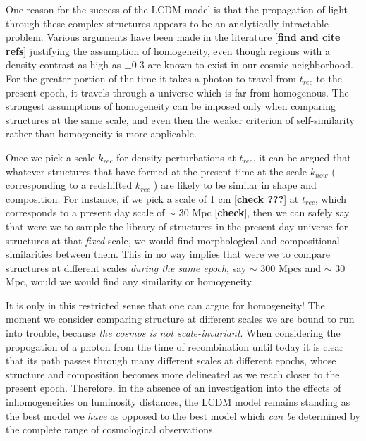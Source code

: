 One reason for the success of the LCDM model is that the propagation of light through these complex structures appears to be an analytically intractable problem. Various arguments have been made in the literature [\textbf{find and cite refs}] justifying the assumption of homogeneity, even though regions with a density contrast as high as $ \pm 0.3 $ are known to exist in our cosmic neighborhood. For the greater portion of the time it takes a photon to travel from $ t_{rec} $ to the present epoch, it travels through a universe which is far from homogenous. The strongest assumptions of homogeneity can be imposed only when comparing structures at the same scale, and even then the weaker criterion of self-similarity rather than homogeneity is more applicable.

Once we pick a scale $ k_{rec} $ for density perturbations at $ t_{rec}  $, it can be argued that whatever structures that have formed at the present time at the scale $ k_{now} $ ( corresponding to a redshifted $ k_{rec} $ ) are likely to be similar in shape and composition. For instance, if we pick a scale of 1 cm [\textbf{check ???}] at $ t_{rec} $, which corresponds to a present day scale of $ \sim $ 30 Mpc [\textbf{check}], then we can safely say that were we to sample the library of structures in the present day universe for structures at that \emph{fixed} scale, we would find morphological and compositional similarities between them. This in no way implies that were we to compare structures at different scales \emph{during the same epoch}, say $ \sim $ 300 Mpcs and $ \sim $ 30 Mpc, would we would find any similarity or homogeneity.

It is only in this restricted sense that one can argue for homogeneity! The moment we consider comparing structure at different scales we are bound to run into trouble, because \emph{the cosmos is not scale-invariant}. When considering the propogation of a photon from the time of recombination until today it is clear that its path passes through many different scales at different epochs, whose structure and composition becomes more delineated as we reach closer to the present epoch. Therefore, in the absence of an investigation into the effects of inhomogeneities on luminosity distances, the LCDM model remains standing as the best model we \emph{have} as opposed to the best model which \emph{can be} determined by the complete range of cosmological observations.


